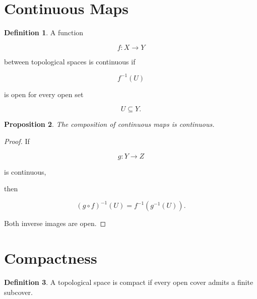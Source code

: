 \documentclass[11pt]{book}
\numberwithin{equation}{chapter}
\theoremstyle{definition}
\newtheorem{definition}{Definition}[chapter]
\theoremstyle{plain}
\newtheorem{proposition}[definition]{Proposition}
\begin{document}

\section{Continuous Maps}

\begin{definition}

A function

\[
f:
X
\rightarrow
Y
\]

between topological spaces is continuous if

\[
f^{-1}(U)
\]

is open for every open set

\[
U
\subseteq
Y.
\]

\end{definition}


\begin{proposition}

The composition of continuous maps is continuous.

\end{proposition}

\begin{proof}

If

\[
g:Y\to Z
\]

is continuous,

then

\[
(g\circ f)^{-1}(U)
=
f^{-1}(g^{-1}(U)).
\]

Both inverse images are open.

\end{proof}


\section{Compactness}

\begin{definition}

A topological space is compact if every open cover admits a finite
subcover.

\end{definition}

\end{document}
